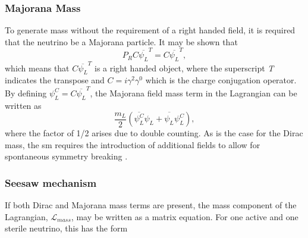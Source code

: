 \subsubsection{Majorana Mass}
To generate mass without the requirement of a right handed field, it is required that the neutrino be a Majorana particle. It may be shown that 
\begin{equation}
    P_R C\overline{\psi_L}^T = C\overline{\psi_L}^T,
\end{equation}
which means that $C\overline{\psi_L}^T$ is a right handed object, where the superscript \textit{T} indicates the transpose and $C = i \gamma^2 \gamma^0$ which is the charge conjugation operator. By defining $\psi_L^C = C\overline{\psi_L}^T$, the Majorana field mass term in the Lagrangian can be written as
\begin{equation}\label{eqn:Majorana mass term}
    \frac{m_L}{2}(\overline{\psi_L^C}\psi_L + \overline{\psi_L^{\phantom{C}}}\psi_L^C), 
\end{equation}
where the factor of 1/2 arises due to double counting. As is the case for the Dirac mass, the \gls{sm} requires the introduction of additional fields to allow for spontaneous symmetry breaking \cite{Fundamentals_of_Neutrino_Physics_and_Astrophysics}. 

\subsubsection{Seesaw mechanism}\label{sec:seesaw_mechanism}
If both Dirac and Majorana mass terms are present, the mass component of the Lagrangian, $\mathcal{L}_{mass}$, may be written as a matrix equation. For one active and one sterile neutrino, this has the form

